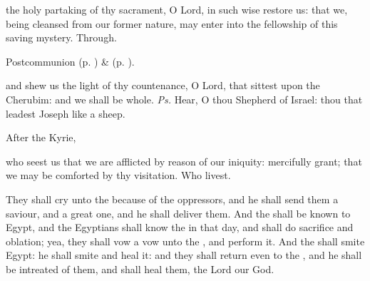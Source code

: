 
\postcommunion
{} the holy partaking of thy sacrament, O Lord, in such wise restore us: that we, being cleansed from our former nature, may enter into the fellowship of this saving mystery. Through.

\begin{rubric}
     Postcommunion  (p. \pageref{AdventIPostcommunion}) \&   (p. \pageref{SPMaryInAdvent}).
\end{rubric}



\introit
{} and shew us the light of thy countenance, O Lord, that sittest upon the Cherubim: and we shall be whole. \textit{Ps.} Hear, O thou Shepherd of Israel: thou that leadest Joseph like a sheep.

\begin{rubric}
    After the Kyrie,
\end{rubric}

\collect
{} who seest us that we are afflicted by reason of our iniquity: mercifully grant; that we may be comforted by thy visitation. Who livest.


 They shall cry unto the  because of the oppressors, and he shall send them a saviour, and a great one, and he shall deliver them. And the  shall be known to Egypt, and the Egyptians shall know the  in that day, and shall do sacrifice and oblation; yea, they shall vow a vow unto the , and perform it. And the  shall smite Egypt: he shall smite and heal it: and they shall return even to the , and he shall be intreated of them, and shall heal them, the Lord our God.

\\

